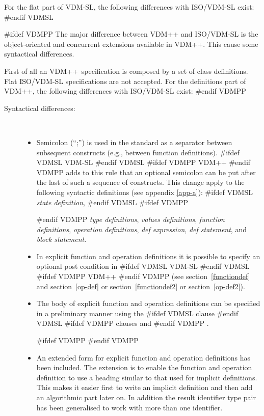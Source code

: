 \documentclass[\pformat,12pt]{article}
\newcommand{\vdmslpp}[2]{%
#ifdef VDMSL
#1
#endif VDMSL
#ifdef VDMPP
#2
#endif VDMPP
}
\newcommand{\vdmsl}{VDM-SL}
\newcommand{\vdmpp}{VDM++}
\begin{document}
For the flat part of  VDM-SL, the following differences with ISO/VDM-SL
exist:
#endif VDMSL

#ifdef VDMPP
The major difference between  {\vdmpp} and ISO/VDM-SL is the
object-oriented and concurrent %
extensions available in 
\vdmpp. This cause some syntactical differences.

First of all an  \vdmpp\ specification is composed by a set of
class definitions. Flat ISO/VDM-SL specifications are not
accepted. For the definitions part of  \vdmpp, the following differences
with ISO/VDM-SL exist:
#endif VDMPP

\begin{description}
\item[Syntactical differences:]\mbox{}\\
  \begin{itemize}
  
  \item Semicolon (``;'') is used in the standard as a separator
    between subsequent constructs (e.g., between function
    definitions).  \vdmslpp{\vdmsl}{\vdmpp} adds to this rule that
    an optional semicolon can be put after the last of such a sequence
    of constructs. This change apply to the following syntactic
    definitions (see appendix \ref{app-a}): \vdmslpp{{\em state
    definition},}{} {\em type definitions}, {\em values definitions},
    {\em function definitions}, {\em operation definitions}, {\em def
    expression}, {\em def statement}, and {\em block statement}.

  \item In explicit function and operation definitions it is possible
    to specify an optional post condition in 
    \vdmslpp{VDM-SL}{\vdmpp} (see section~\ref{functiondef} and
    section~\ref{op-def} or section~\ref{functiondef2} or
    section~\ref{op-def2}).

  \item The body of explicit function and operation definitions can be
    specified in a preliminary manner using the \vdmslpp{clause}{clauses
     and} .

#ifdef VDMPP
#endif VDMPP
    
  \item An extended form for explicit function and operation
    definitions has been included. The extension is to enable the
    function and operation definition to use a heading similar to that
    used for implicit definitions. This makes it easier first to write
    an implicit definition and then add an algorithmic part later
    on. In addition the result identifier type pair has been
    generalised to work with more than one identifier.


\end{itemize}
\end{description}
\end{document}
